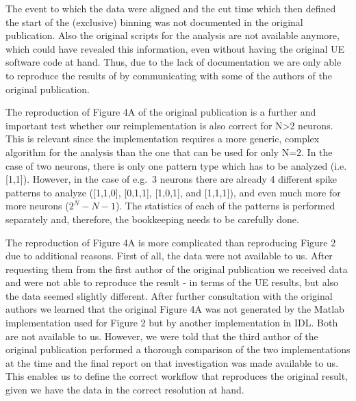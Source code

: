 \documentclass[10pt,a4paper,onecolumn]{article}
\begin{document}
The event to which the data were aligned and the cut time which then
defined the start of the (exclusive) binning was not documented in the
original publication. Also the original scripts for the analysis are not
available anymore, which could have revealed this information, even
without having the original UE software code at hand. Thus, due to the
lack of documentation we are only able to reproduce the results of
\autocite{Riehle97} by communicating with some of the authors of the
original publication.

The reproduction of Figure 4A of the original publication is a further
and important test whether our reimplementation is also correct for
N\textgreater{}2 neurons. This is relevant since the implementation
requires a more generic, complex algorithm for the analysis than the one
that can be used for only N=2. In the case of two neurons, there is only
one pattern type which has to be analyzed (i.e. {[}1,1{]}). However, in
the case of e.g.~3 neurons there are already 4 different spike patterns
to analyze ({[}1,1,0{]}, {[}0,1,1{]}, {[}1,0,1{]}, and {[}1,1,1{]}), and
even much more for more neurons (\(2^{N}-N-1\)). The statistics of each
of the patterns is performed separately and, therefore, the bookkeeping
needs to be carefully done.

The reproduction of Figure 4A is more complicated than reproducing
Figure 2 due to additional reasons. First of all, the data were not
available to us. After requesting them from the first author of the
original publication we received data and were not able to reproduce the
result - in terms of the UE results, but also the data seemed slightly
different. After further consultation with the original authors we
learned that the original Figure 4A was not generated by the Matlab
implementation used for Figure 2 but by another implementation in IDL.
Both are not available to us. However, we were told that the third
author of the original publication performed a thorough comparison of
the two implementations at the time and the final report on that
investigation was made available to us. This enables us to define the
correct workflow that reproduces the original result, given we have the
data in the correct resolution at hand.
\end{document}
